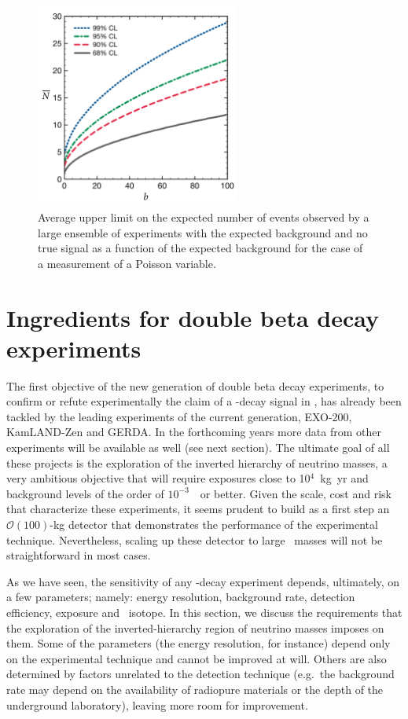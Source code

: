 \documentclass{PoS}
\begin{document}
\begin{figure}
\centering
\includegraphics[width=0.6\textwidth]{img/FCAverageUpperLimit.pdf}
\caption{Average upper limit on the expected number of events observed by a large ensemble of experiments with the expected background and no true signal as a function of the expected background for the case of a measurement of a Poisson variable.} \label{fig:FCAverageUpperLimit}
\end{figure}


\section{Ingredients for double beta decay experiments} 
The first objective of the new generation of double beta decay experiments, to confirm or refute experimentally the claim of a \bbonu-decay signal in \GE, has already been tackled by the leading experiments of the current generation,  EXO-200, KamLAND-Zen and GERDA. In the forthcoming years  more data from other experiments will be available as well (see next section). The ultimate goal of all these projects is the exploration of the inverted hierarchy of neutrino masses, a very ambitious objective that will require exposures close to 10$^{4}$~kg~yr and background levels of the order of $10^{-3}$~\ckky\ or better. Given the scale, cost and risk that characterize these experiments, it seems prudent to build as a first step an $\mathcal{O}(100)$-kg detector that demonstrates the performance of the experimental technique. Nevertheless, scaling up these detector to large \bb\ masses will not be straightforward in most cases. 

As we have seen, the sensitivity of any \bbonu-decay experiment depends, ultimately, on a few parameters; namely: energy resolution, background rate, detection efficiency, exposure and \bb\ isotope. In this section, we discuss the requirements that the exploration of the inverted-hierarchy region of neutrino masses imposes on them. 
Some of the parameters (the energy resolution, for instance) depend only on the experimental technique and cannot be improved at will. Others are also determined by factors unrelated to the detection technique (e.g.\ the background rate may depend on the availability of radiopure materials or the depth of the underground laboratory), leaving more room for improvement.
\end{document}
